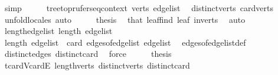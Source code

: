 \begin{isabellebody}
\ simp\isanewline
\ \ \isamarkupfalse%
\ \isamarkupfalse%
\ {\isachardoublequoteopen}tree{\isacharunderscore}{\kern0pt}to{\isacharunderscore}{\kern0pt}prufer{\isacharunderscore}{\kern0pt}seq{\isacharunderscore}{\kern0pt}context\ {\isacharquery}{\kern0pt}verts{\isacharprime}{\kern0pt}\ {\isacharquery}{\kern0pt}edge{\isacharunderscore}{\kern0pt}list{\isacharprime}{\kern0pt}{\isachardoublequoteclose}\ \isamarkupfalse%
\ distinct{\isacharunderscore}{\kern0pt}verts{\isacharprime}{\kern0pt}\ card{\isacharunderscore}{\kern0pt}verts{\isacharprime}{\kern0pt}\ \isamarkupfalse%
\ {\isacharparenleft}{\kern0pt}unfold{\isacharunderscore}{\kern0pt}locales{\isacharcomma}{\kern0pt}\ auto{\isacharparenright}{\kern0pt}\isanewline
\ \ \isamarkupfalse%
\ \isamarkupfalse%
\ {\isacharquery}{\kern0pt}thesis\ \isamarkupfalse%
\ that\ leaf{\isacharunderscore}{\kern0pt}find\ leaf\ in{\isacharunderscore}{\kern0pt}verts\ \isamarkupfalse%
\ auto\isanewline
{}\isamarkupfalse%
%
\endisatagproof
{\isafoldproof}%
%
\isadelimproof
\isanewline
%
\endisadelimproof
\isanewline
{}\isamarkupfalse%
\ length{\isacharunderscore}{\kern0pt}edge{\isacharunderscore}{\kern0pt}list{\isacharcolon}{\kern0pt}\ {\isachardoublequoteopen}length\ edge{\isacharunderscore}{\kern0pt}list\ {\isasymge}\ {}{\isachardoublequoteclose}\isanewline
%
\isadelimproof
%
\endisadelimproof
%
\isatagproof
{}\isamarkupfalse%
{\isacharminus}{\kern0pt}\isanewline
\ \ \isamarkupfalse%
\ {\isachardoublequoteopen}length\ edge{\isacharunderscore}{\kern0pt}list\ {\isacharequal}{\kern0pt}\ card\ {\isacharparenleft}{\kern0pt}edges{\isacharunderscore}{\kern0pt}of{\isacharunderscore}{\kern0pt}edge{\isacharunderscore}{\kern0pt}list\ edge{\isacharunderscore}{\kern0pt}list{\isacharparenright}{\kern0pt}{\isachardoublequoteclose}\ \isamarkupfalse%
\ edges{\isacharunderscore}{\kern0pt}of{\isacharunderscore}{\kern0pt}edge{\isacharunderscore}{\kern0pt}list{\isacharunderscore}{\kern0pt}def\ \isamarkupfalse%
\ distinct{\isacharunderscore}{\kern0pt}edges\ distinct{\isacharunderscore}{\kern0pt}card\ \isamarkupfalse%
\ force\isanewline
\ \ \isamarkupfalse%
\ \isamarkupfalse%
\ {\isacharquery}{\kern0pt}thesis\ \isamarkupfalse%
\ t{\isachardot}{\kern0pt}card{\isacharunderscore}{\kern0pt}V{\isacharunderscore}{\kern0pt}card{\isacharunderscore}{\kern0pt}E\ length{\isacharunderscore}{\kern0pt}verts\ distinct{\isacharunderscore}{\kern0pt}verts\ distinct{\isacharunderscore}{\kern0pt}card\ \isamarkupfalse%

\end{isabellebody}
